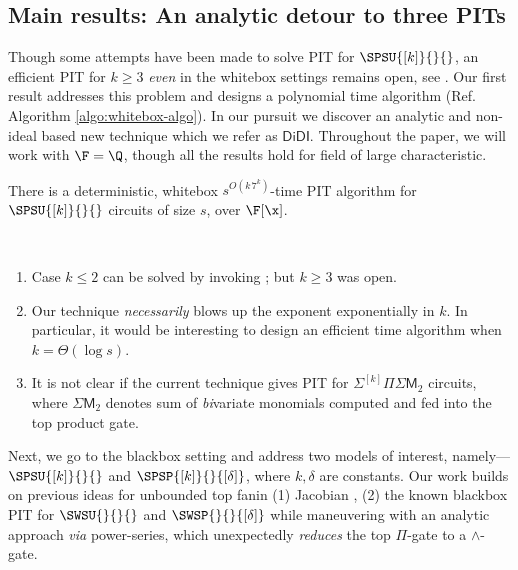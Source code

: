 \vspace*{1em}
\subsection{Main results: An analytic detour to three PITs}
Though some attempts have been made to solve PIT for $\SPSU{[k]}{}{}$, an efficient PIT for $k \ge 3$  \emph{even} in the whitebox settings remains open, see \cite[Open Prob.~2]{saha2013case}. Our first result addresses this problem and designs a polynomial time algorithm (Ref. Algorithm \ref{algo:whitebox-algo}). In our pursuit we discover an analytic and non-ideal based new technique which we refer as $\mathsf{DiDI}$. Throughout the paper, we will work with $\F=\Q$, though all the results hold for field of large characteristic. 

\begin{theorem} \label{thm:thm1}
There is a deterministic, whitebox $s^{O(k\,7^k)}$-time PIT algorithm for $\SPSU{[k]}{}{}$ circuits of size $s$, over $\F[\x]$.
\end{theorem}

\begin{remark*} ~ 
    \begin{enumerate}
        \item Case $k \le 2$ can be solved by invoking \cite[Theorem 5.2]{saha2013case}; but $k \ge3$ was open.
        \item Our technique \emph{necessarily} blows up the exponent exponentially in $k$. In particular, it would be interesting to design an efficient time algorithm when $k=\Theta(\log s)$.
        \item It is not clear if the current technique gives PIT for $\Sigma^{[k]}\Pi\Sigma\mathsf{M}_2$ circuits, where \(\Sigma\mathsf{M}_2\) denotes sum of {\em bi}variate monomials computed and fed into the top product gate.
%
    \end{enumerate}
\end{remark*}

Next, we go to the blackbox setting and address two models of interest, namely--- $\SPSU{[k]}{}{}$ and $\SPSP{[k]}{}{[\delta]}$, where $k, \delta$ are constants. Our work builds on previous ideas for unbounded top fanin (1) Jacobian \cite{agrawal2016jacobian}, (2) the known blackbox PIT for $\SWSU{}{}{}$ and $\SWSP{}{}{[\delta]}$ \cite{gurjarARO,forbes2015deterministic} while maneuvering with an analytic approach \emph{via} power-series, which unexpectedly \emph{reduces} the top $\Pi$-gate to a $\wedge$-gate.

